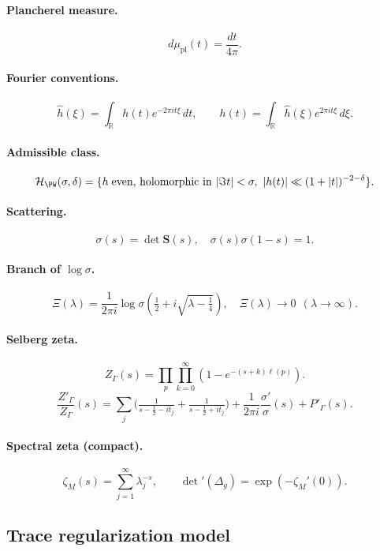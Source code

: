 \paragraph{Plancherel measure.}
\[
d\mu_{\mathrm{pl}}(t)=\frac{dt}{4\pi}.
\]

\paragraph{Fourier conventions.}
\[
\hat h(\xi)=\int_{\mathbb R} h(t)e^{-2\pi i t\xi}\,dt,
\qquad
h(t)=\int_{\mathbb R}\hat h(\xi)e^{2\pi i t\xi}\,d\xi.
\]

\paragraph{Admissible class.}
\[
\mathcal H_{\PW}(\sigma,\delta)
=\{h\;\text{even, holomorphic in }|\Im t|<\sigma,\ |h(t)|\ll (1+|t|)^{-2-\delta}\}.
\]

\paragraph{Scattering.}
\[
\sigma(s)=\det \mathbf S(s), \quad \sigma(s)\sigma(1-s)=1.
\]

\paragraph{Branch of $\log\sigma$.}
\[
\Xi(\lambda) = \frac{1}{2\pi i}\log \sigma\!\left(\tfrac12+i\sqrt{\lambda-\tfrac14}\right),
\quad \Xi(\lambda)\to 0 \ \ (\lambda\to\infty).
\]

\paragraph{Selberg zeta.}
\[
Z_\Gamma(s) = \prod_p\prod_{k=0}^\infty (1-e^{-(s+k)\ell(p)}).
\]
\[
\frac{Z'_\Gamma}{Z_\Gamma}(s)=\sum_j\Big(\tfrac{1}{s-\tfrac12-it_j}+\tfrac{1}{s-\tfrac12+it_j}\Big)
+\frac{1}{2\pi i}\frac{\sigma'}{\sigma}(s)+P'_\Gamma(s).
\]

\paragraph{Spectral zeta (compact).}
\[
\zeta_M(s)=\sum_{j=1}^\infty \lambda_j^{-s},
\qquad
\det{}'(\Delta_g)=\exp(-\zeta_M'(0)).
\]

\subsection{Trace regularization model}


